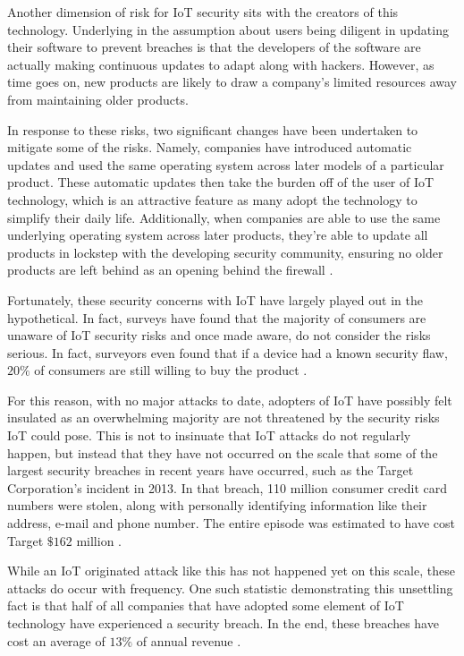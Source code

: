 \documentclass[sigconf]{acmart}
\begin{document}
Another dimension of risk for IoT security sits with the creators of this technology. Underlying in the assumption about users being diligent in updating their software to prevent breaches is that the developers of the software are actually making continuous updates to adapt along with hackers. However, as time goes on, new products are likely to draw a company's limited resources away from maintaining older products. 

In response to these risks, two significant changes have been undertaken to mitigate some of the risks. Namely, companies have introduced automatic updates and used the same operating system across later models of a particular product. These automatic updates then take the burden off of the user of IoT technology, which is an attractive feature as many adopt the technology to simplify their daily life. Additionally, when companies are able to use the same underlying operating system across later products, they're able to update all products in lockstep with the developing security community, ensuring no older products are left behind as an opening behind the firewall \cite{updateiot}. 

Fortunately, these security concerns with IoT have largely played out in the hypothetical. In fact, surveys have found that the majority of consumers are unaware of IoT security risks and once made aware, do not consider the risks serious. In fact, surveyors even found that if a device had a known security flaw, $20\%$ of consumers are still willing to buy the product \cite{mcafee}. 

For this reason, with no major attacks to date, adopters of IoT have possibly felt insulated as an overwhelming majority are not threatened by the security risks IoT could pose. This is not to insinuate that IoT attacks do not regularly happen, but instead that they have not occurred on the scale that some of the largest security breaches in recent years have occurred, such as the Target Corporation's incident in 2013. In that breach, 110 million consumer credit card numbers were stolen, along with personally identifying information like their address, e-mail and phone number. The entire episode was estimated to have cost Target $\$162$ million \cite{target}.

While an IoT originated attack like this has not happened yet on this scale, these attacks do occur with frequency. One such statistic demonstrating this unsettling fact is that half of all companies that have adopted some element of IoT technology have experienced a security breach. In the end, these breaches have cost an average of $13\%$ of annual revenue \cite{halfbreach}. 
\end{document}
